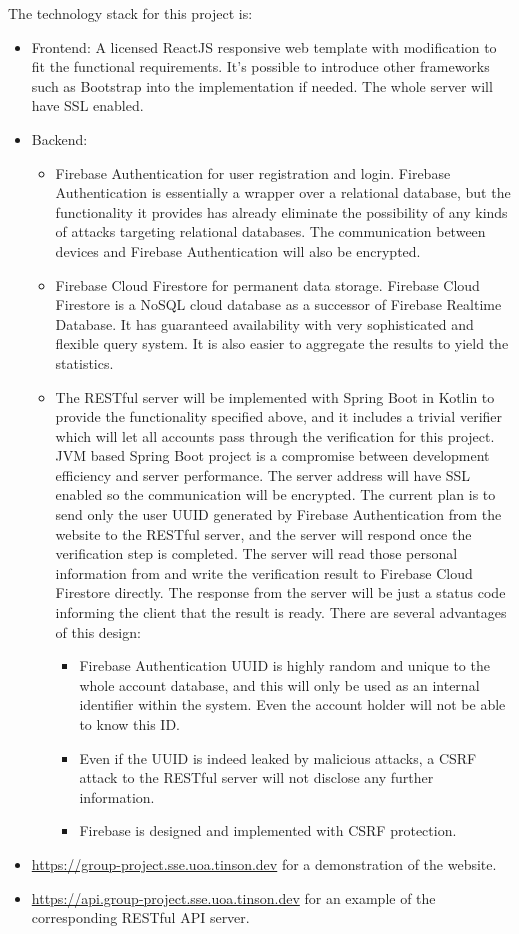 \documentclass[12pt]{article}
\begin{document}
The technology stack for this project is:
\begin{itemize}
  \item Frontend: A licensed ReactJS responsive web template with modification to fit the functional requirements. It's possible to introduce other frameworks such as Bootstrap into the implementation if needed. The whole server will have SSL enabled.
  \item Backend:
  \begin{itemize}
    \item Firebase Authentication for user registration and login. Firebase Authentication is essentially a wrapper over a relational database, but the functionality it provides has already eliminate the possibility of any kinds of attacks targeting relational databases. The communication between devices and Firebase Authentication will also be encrypted.
    \item Firebase Cloud Firestore for permanent data storage. Firebase Cloud Firestore is a NoSQL cloud database as a successor of Firebase Realtime Database. It has guaranteed availability with very sophisticated and flexible query system. It is also easier to aggregate the results to yield the statistics.
    \item The RESTful server will be implemented with Spring Boot in Kotlin to provide the functionality specified above, and it includes a trivial verifier which will let all accounts pass through the verification for this project. JVM based Spring Boot project is a compromise between development efficiency and server performance. The server address will have SSL enabled so the communication will be encrypted. The current plan is to send only the user UUID generated by Firebase Authentication from the website to the RESTful server, and the server will respond once the verification step is completed. The server will read those personal information from and write the verification result to Firebase Cloud Firestore directly. The response from the server will be just a status code informing the client that the result is ready. There are several advantages of this design:
    \begin{itemize}
      \item Firebase Authentication UUID is highly random and unique to the whole account database, and this will only be used as an internal identifier within the system. Even the account holder will not be able to know this ID.
      \item Even if the UUID is indeed leaked by malicious attacks, a CSRF attack to the RESTful server will not disclose any further information.
      \item Firebase is designed and implemented with CSRF protection.
    \end{itemize}
  \end{itemize}
  \item \url{https://group-project.sse.uoa.tinson.dev} for a demonstration of the website.
  \item \url{https://api.group-project.sse.uoa.tinson.dev} for an example of the corresponding RESTful API server.
\end{itemize}
\end{document}

